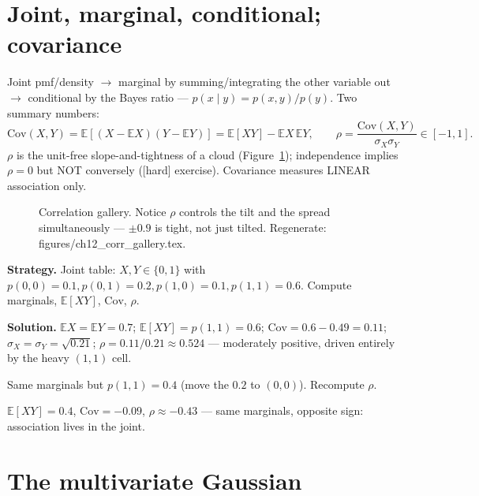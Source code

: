 \section{Joint, marginal, conditional; covariance}\label{sec:prob-joint}

Joint pmf/density $\to$ marginal by summing/integrating the other variable
out $\to$ conditional by the Bayes ratio ---
$p(x\mid y)=p(x,y)/p(y)$. Two summary numbers:
\[
\mathrm{Cov}(X,Y)=\mathbb E[(X-\mathbb EX)(Y-\mathbb EY)]
=\mathbb E[XY]-\mathbb EX\,\mathbb EY,
\qquad
\rho=\frac{\mathrm{Cov}(X,Y)}{\sigma_X\sigma_Y}\in[-1,1].
\]
$\rho$ is the unit-free slope-and-tightness of a cloud
(Figure~\ref{fig:corrgallery}); independence implies $\rho=0$ but NOT
conversely ([hard] exercise). Covariance measures LINEAR association
only.

\begin{figure}[htbp]
\centering

\caption{Correlation gallery. Notice $\rho$ controls the tilt and the
spread simultaneously --- $\pm0.9$ is tight, not just tilted.
Regenerate: \ttfamily figures/ch12\_corr\_gallery.tex.}
\label{fig:corrgallery}
\end{figure}

\begin{example}\label{ex:cov}
\textbf{Strategy.} Joint table: $X,Y\in\{0,1\}$ with
$p(0,0)=0.1,p(0,1)=0.2,p(1,0)=0.1,p(1,1)=0.6$. Compute marginals,
$\mathbb E[XY]$, $\mathrm{Cov}$, $\rho$.

\textbf{Solution.} $\mathbb EX=\mathbb EY=0.7$;
$\mathbb E[XY]=p(1,1)=0.6$;
$\mathrm{Cov}=0.6-0.49=0.11$;
$\sigma_X=\sigma_Y=\sqrt{0.21}$;
$\rho=0.11/0.21\approx0.524$ --- moderately positive, driven entirely by
the heavy $(1,1)$ cell.
\end{example}

\begin{exercise}[medium]
Same marginals but $p(1,1)=0.4$ (move the $0.2$ to $(0,0)$). Recompute
$\rho$.
\begin{solution}
$\mathbb E[XY]=0.4$, $\mathrm{Cov}=-0.09$, $\rho\approx-0.43$ --- same
marginals, opposite sign: association lives in the joint.
\end{solution}
\end{exercise}

\section{The multivariate Gaussian}\label{sec:prob-mvn}

